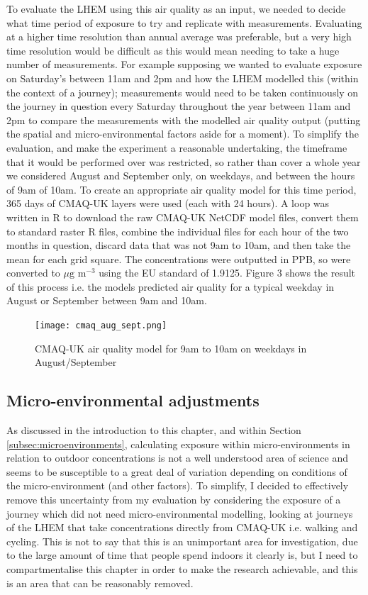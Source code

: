 To evaluate the LHEM using this air quality as an input, we needed to decide what time period of exposure to try and replicate with measurements. Evaluating at a higher time resolution than annual average was preferable, but a very high time resolution would be difficult as this would mean needing to take a huge number of measurements. For example supposing we wanted to evaluate exposure on Saturday’s between 11am and 2pm and how the LHEM modelled this (within the context of a journey); measurements would need to be taken continuously on the journey in question every Saturday throughout the year between 11am and 2pm to compare the measurements with the modelled air quality output (putting the spatial and micro-environmental factors aside for a moment). 
To simplify the evaluation, and make the experiment a reasonable undertaking, the timeframe that it would be performed over was restricted, so rather than cover a whole year we considered August and September only, on weekdays, and between the hours of 9am of 10am. To create an appropriate air quality model for this time period, 365 days of CMAQ-UK layers were used (each with 24 hours). A loop was written in R to download the raw CMAQ-UK NetCDF model files, convert them to standard raster R files, combine the individual files for each hour of the two months in question, discard data that was not 9am to 10am, and then take the mean for each grid square. The concentrations were outputted in PPB, so were converted to $\mu \text{g m}^{-3}$ using the EU standard of 1.9125. Figure 3 shows the result of this process i.e. the models predicted air quality for a typical weekday in August or September between 9am and 10am.

\begin{figure}[H]
\centering
\texttt{[image: cmaq\_aug\_sept.png]}
\caption{CMAQ-UK air quality model for 9am to 10am on weekdays in August/September}
\label{fig:cmaq_aug_sept}
\end{figure}

\subsection{Micro-environmental adjustments}
\label{subsec:4microenvironmentaladjustments}

As discussed in the introduction to this chapter, and within  Section \ref{subsec:microenvironments}, calculating exposure within micro-environments in relation to outdoor concentrations is not a well understood area of science and seems to be susceptible to a great deal of variation depending on conditions of the micro-environment (and other factors). To simplify, I decided to effectively remove this uncertainty from my evaluation by considering the exposure of a journey which did not need micro-environmental modelling, looking at journeys of the LHEM that take concentrations directly from CMAQ-UK i.e. walking and cycling. This is not to say that this is an unimportant area for investigation, due to the large amount of time that people spend indoors it clearly is, but I need to compartmentalise this chapter in order to make the research achievable, and this is an area that can be reasonably removed.

